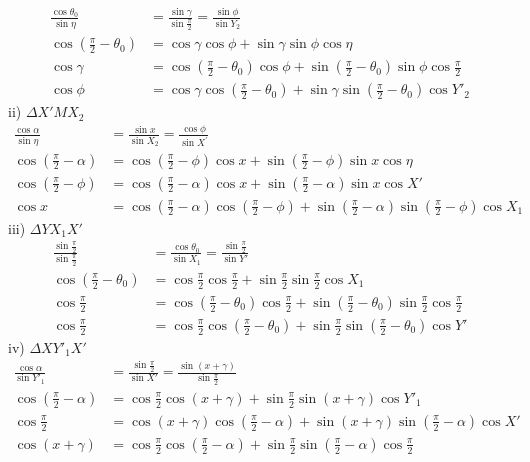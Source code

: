 \begin{align*}
\frac{\cos{\theta_0}}{\sin{\eta}}&=\frac{\sin{\gamma}}{\sin{\frac{\pi}{2}}}=\frac{\sin{\phi}}{\sin{Y_2}}\\
\cos{(\frac{\pi}{2}-\theta_0)}&=\cos{\gamma}\cos{\phi}+\sin{\gamma}\sin{\phi}\cos{\eta}\\
\cos{\gamma}&=\cos{(\frac{\pi}{2}-\theta_0)}\cos{\phi}+\sin{(\frac{\pi}{2}-\theta_0)}\sin{\phi}\cos{\frac{\pi}{2}}\\
\cos{\phi}&=\cos{\gamma}\cos{(\frac{\pi}{2}-\theta_0)}+\sin{\gamma}\sin{(\frac{\pi}{2}-\theta_0)}\cos{Y'_2}
\end{align*}
ii) $\Delta X'MX_2$
\begin{align*}
\frac{\cos{\alpha}}{\sin{\eta}}&=\frac{\sin{x}}{\sin{X_2}}=\frac{\cos{\phi}}{\sin{X^{'}}}\\
\cos{(\frac{\pi}{2}-\alpha)}&=\cos{(\frac{\pi}{2}-\phi)}\cos{x}+\sin{(\frac{\pi}{2}-\phi)}\sin{x}\cos{\eta}\\
\cos{(\frac{\pi}{2}-\phi)}&=\cos{(\frac{\pi}{2}-\alpha)}\cos{x}+\sin{(\frac{\pi}{2}-\alpha)}\sin{x}\cos{X'}\\
\cos{x}&=\cos{(\frac{\pi}{2}-\alpha)}\cos{(\frac{\pi}{2}-\phi)}+\sin{(\frac{\pi}{2}-\alpha)}\sin{(\frac{\pi}{2}-\phi)}\cos{X_1}
\end{align*}
iii) $\Delta YX_1X'$
\begin{align*}
\frac{\sin{\frac{\pi}{2}}}{\sin{\frac{\pi}{2}}}&=\frac{\cos{\theta_0}}{\sin{X_1}}=\frac{\sin{\frac{\pi}{2}}}{\sin{Y'}}\\
\cos{(\frac{\pi}{2}-\theta_0)}&=\cos{\frac{\pi}{2}}\cos{\frac{\pi}{2}}+\sin{\frac{\pi}{2}}\sin{\frac{\pi}{2}}\cos{X_1}\\
\cos{\frac{\pi}{2}}&=\cos{(\frac{\pi}{2}-\theta_0)}\cos{\frac{\pi}{2}}+\sin{(\frac{\pi}{2}-\theta_0)}\sin{\frac{\pi}{2}}\cos{\frac{\pi}{2}}\\
\cos{\frac{\pi}{2}}&=\cos{\frac{\pi}{2}}\cos{(\frac{\pi}{2}-\theta_0)}+\sin{\frac{\pi}{2}}\sin{(\frac{\pi}{2}-\theta_0)}\cos{Y'}
\end{align*}
iv) $\Delta XY'_1X'$
\begin{align*}
\frac{\cos{\alpha}}{\sin{Y'_1}}&=\frac{\sin{\frac{\pi}{2}}}{\sin{X'}}=\frac{\sin{(x+\gamma)}}{\sin{\frac{\pi}{2}}}\\
\cos{(\frac{\pi}{2}-\alpha)}&=\cos{\frac{\pi}{2}}\cos{(x+\gamma)}+\sin{\frac{\pi}{2}}\sin{(x+\gamma)}\cos{Y'_1}\\
\cos{\frac{\pi}{2}}&=\cos{(x+\gamma)}\cos{(\frac{\pi}{2}-\alpha)}+\sin{(x+\gamma)}\sin{(\frac{\pi}{2}-\alpha)}\cos{X'}\\
\cos{(x+\gamma)}&=\cos{\frac{\pi}{2}}\cos{(\frac{\pi}{2}-\alpha)}+\sin{\frac{\pi}{2}}\sin{(\frac{\pi}{2}-\alpha)}\cos{\frac{\pi}{2}}
\end{align*}
